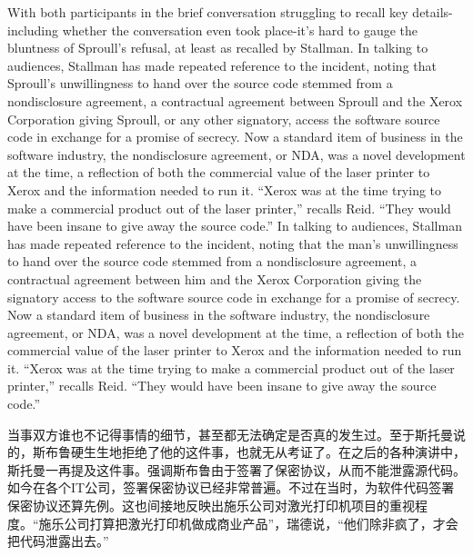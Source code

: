 \ifdefined\eng
\ifdefined\vone
With both participants in the brief conversation struggling to recall key details-including whether the conversation even took place-it's hard to gauge the bluntness of Sproull's refusal, at least as recalled by Stallman. In talking to audiences, Stallman has made repeated reference to the incident, noting that Sproull's unwillingness to hand over the source code stemmed from a nondisclosure agreement, a contractual agreement between Sproull and the Xerox Corporation giving Sproull, or any other signatory, access the software source code in exchange for a promise of secrecy. Now a standard item of business in the software industry, the nondisclosure agreement, or NDA, was a novel development at the time, a reflection of both the commercial value of the laser printer to Xerox and the information needed to run it. ``Xerox was at the time trying to make a commercial product out of the laser printer,'' recalls Reid. ``They would have been insane to give away the source code.''
\fi
\ifdefined\vtwo
In talking to audiences, Stallman has made repeated reference to the incident, noting that the man's unwillingness to hand over the source code stemmed from a nondisclosure agreement, a contractual agreement between him and the Xerox Corporation giving the signatory access to the software source code in exchange for a promise of secrecy. Now a standard item of business in the software industry, the nondisclosure agreement, or NDA, was a novel development at the time, a reflection of both the commercial value of the laser printer to Xerox and the information needed to run it. ``Xerox was at the time trying to make a commercial product out of the laser printer,'' recalls Reid. ``They would have been insane to give away the source code.''
\fi
\fi

\ifdefined\chs
当事双方谁也不记得事情的细节，甚至都无法确定是否真的发生过。至于斯托曼说的，斯布鲁硬生生地拒绝了他的这件事，也就无从考证了。在之后的各种演讲中，斯托曼一再提及这件事。强调斯布鲁由于签署了保密协议，从而不能泄露源代码。如今在各个IT公司，签署保密协议已经非常普遍。不过在当时，为软件代码签署保密协议还算先例。这也间接地反映出施乐公司对激光打印机项目的重视程度。``施乐公司打算把激光打印机做成商业产品''，瑞德说，``他们除非疯了，才会把代码泄露出去。''
\fi

